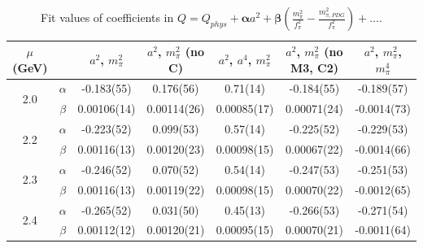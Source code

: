 \documentclass[12pt]{extarticle}
\begin{document}
\begin{table}[h!]
\begin{center}
\begin{tabular}{|c c|c|c|c|c|c|}
\hline
$\mu$ (GeV) &  & $a^2$, $m_\pi^2$& $a^2$, $m_\pi^2$ (no C)& $a^2$, $a^4$, $m_\pi^2$& $a^2$, $m_\pi^2$ (no M3, C2)& $a^2$, $m_\pi^2$, $m_\pi^4$\\
\hline
\multirow{2}{0.5in}{2.0} & $\alpha$ & -0.183(55)& 0.176(56)& 0.71(14)& -0.184(55)& -0.189(57)\\
 & $\beta$ & 0.00106(14)& 0.00114(26)& 0.00085(17)& 0.00071(24)& -0.0014(73)\\
\hline
\multirow{2}{0.5in}{2.2} & $\alpha$ & -0.223(52)& 0.099(53)& 0.57(14)& -0.225(52)& -0.229(53)\\
 & $\beta$ & 0.00116(13)& 0.00120(23)& 0.00098(15)& 0.00067(22)& -0.0014(66)\\
\hline
\multirow{2}{0.5in}{2.3} & $\alpha$ & -0.246(52)& 0.070(52)& 0.54(14)& -0.247(53)& -0.251(53)\\
 & $\beta$ & 0.00116(13)& 0.00119(22)& 0.00098(15)& 0.00070(22)& -0.0012(65)\\
\hline
\multirow{2}{0.5in}{2.4} & $\alpha$ & -0.265(52)& 0.031(50)& 0.45(13)& -0.266(53)& -0.271(54)\\
 & $\beta$ & 0.00112(12)& 0.00120(21)& 0.00095(15)& 0.00070(21)& -0.0011(64)\\
\hline
\end{tabular}
\caption{Fit values of coefficients in $Q = Q_{phys} + \mathbf{\alpha} a^2 + \mathbf{\beta}\left(\frac{m_\pi^2}{f_\pi^2}-\frac{m_{\pi,PDG}^2}{f_\pi^2}\right) + \ldots$.}
\end{center}
\end{table}




















\clearpage
\end{document}
